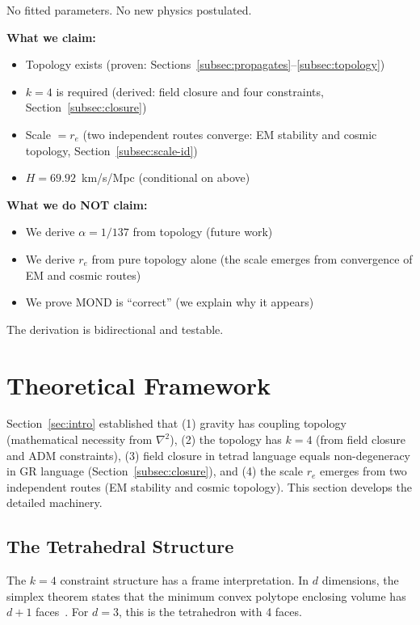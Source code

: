\documentclass[aps,prd,preprint,superscriptaddress,showpacs,preprintnumbers,amsmath,amssymb,nofootinbib]{revtex4-2}
\begin{document}
No fitted parameters. No new physics postulated.

\textbf{What we claim:}
\begin{itemize}
\item Topology exists (proven: Sections~\ref{subsec:propagates}--\ref{subsec:topology})
\item $k=4$ is required (derived: field closure and four constraints, Section~\ref{subsec:closure})
\item Scale $= r_e$ (two independent routes converge: EM stability and cosmic topology, Section~\ref{subsec:scale-id})
\item $H = 69.92$~km/s/Mpc (conditional on above)
\end{itemize}

\textbf{What we do NOT claim:}
\begin{itemize}
\item We derive $\alpha = 1/137$ from topology (future work)
\item We derive $r_e$ from pure topology alone (the scale emerges from convergence of EM and cosmic routes)
\item We prove MOND is ``correct'' (we explain why it appears)
\end{itemize}

The derivation is bidirectional and testable.

\section{Theoretical Framework}
\label{sec:framework}

Section~\ref{sec:intro} established that (1) gravity has coupling topology (mathematical necessity from $\nabla^2$), (2) the topology has $k=4$ (from field closure and ADM constraints), (3) field closure in tetrad language equals non-degeneracy in GR language (Section~\ref{subsec:closure}), and (4) the scale $r_e$ emerges from two independent routes (EM stability and cosmic topology). This section develops the detailed machinery.

\subsection{The Tetrahedral Structure}
\label{subsec:k4}

The $k=4$ constraint structure has a frame interpretation. In $d$ dimensions, the simplex theorem states that the minimum convex polytope enclosing volume has $d+1$ faces~\cite{ziegler1995}. For $d=3$, this is the tetrahedron with 4 faces.
\end{document}
